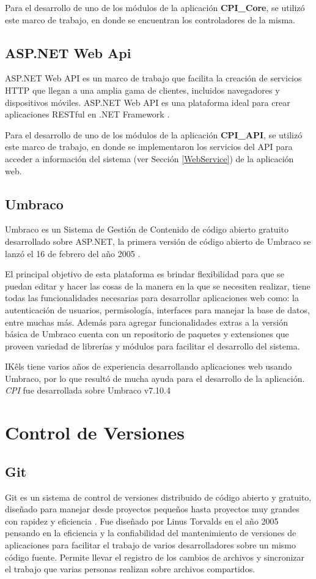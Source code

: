 Para el desarrollo de uno de los módulos de la aplicación \textbf{CPI\_Core}, se utilizó este marco de trabajo, en donde se encuentran los controladores de la misma.

\subsection{ASP.NET Web Api}
ASP.NET Web API es un marco de trabajo que facilita la creación de servicios HTTP que llegan a una amplia gama de clientes, incluidos navegadores y dispositivos móviles. ASP.NET Web API es una plataforma ideal para crear aplicaciones RESTful en .NET Framework \cite{aspWebAPIMicrosoft}.

Para el desarrollo de uno de los módulos de la aplicación \textbf{CPI\_API}, se utilizó este marco de trabajo, en donde se implementaron los servicios del API para acceder a información del sistema (ver Sección \ref{WebService}) de la aplicación web.

\subsection{Umbraco}
Umbraco es un Sistema de Gestión de Contenido de código abierto gratuito desarrollado sobre ASP.NET, la primera versión de código abierto de Umbraco se lanzó el 16 de febrero del año 2005 \cite{umbraco}.

El principal objetivo de esta plataforma es brindar flexibilidad para que se puedan editar y hacer las cosas de la manera en la que se necesiten realizar, tiene todas las funcionalidades necesarias para desarrollar aplicaciones web como: la autenticación de usuarios, permisología, interfaces para manejar la base de datos, entre muchas más. Además para agregar funcionalidades extras a la versión básica de Umbraco cuenta con un repositorio de paquetes y extensiones que proveen variedad de librerías y módulos para facilitar el desarrollo del sistema. 

IKêls tiene varios años de experiencia desarrollando aplicaciones web usando Umbraco, por lo que resultó de mucha ayuda para el desarrollo de la aplicación. \textit{CPI} fue desarrollada sobre Umbraco v7.10.4


\section{Control de Versiones}
\subsection{Git}
Git es un sistema de control de versiones distribuido de código abierto y gratuito, diseñado para manejar desde proyectos pequeños hasta proyectos muy grandes con rapidez y eficiencia \cite{git}. Fue diseñado por Linus Torvalds en el año 2005 pensando en la eficiencia y la confiabilidad del mantenimiento de versiones de aplicaciones para facilitar el trabajo de varios desarrolladores sobre un mismo código fuente. Permite llevar el registro de los cambios de archivos y sincronizar el trabajo que varias personas realizan sobre archivos compartidos.

